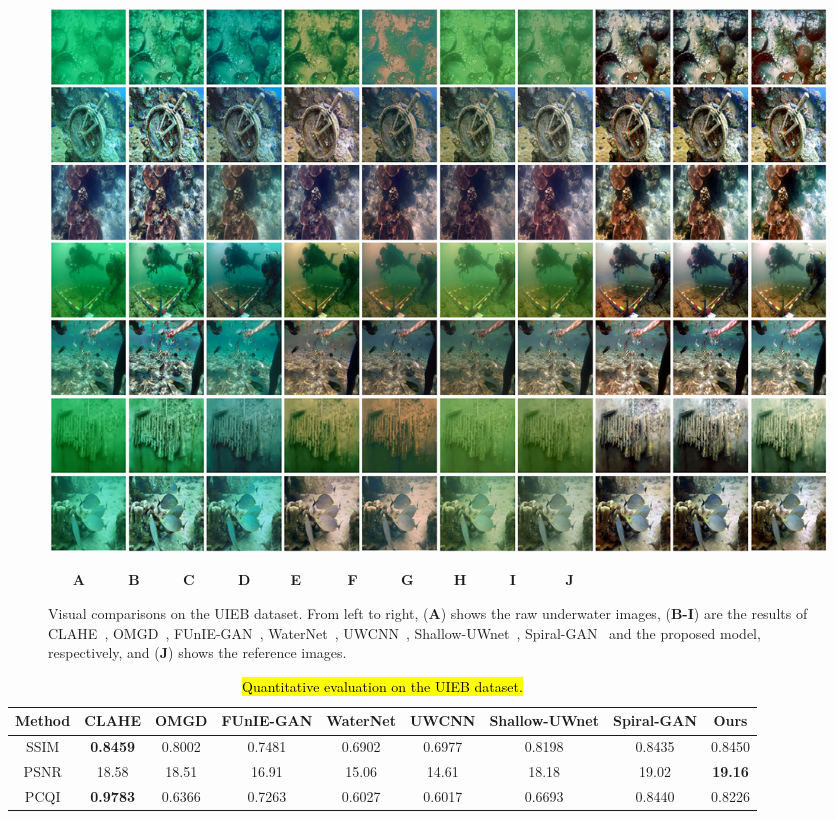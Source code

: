 \documentclass[utf8]{FrontiersinHarvard} %
\begin{document}
\begin{figure}[htbp]
\begin{center}
\includegraphics[width=1\textwidth]{FSpiralGAN_frontiers/onepicture/UIEB300.jpg}
\end{center}
$~~~~~~~~$\textbf{A}$~~~~~~~~~~~~~~$\textbf{B}$~~~~~~~~~~~~~~$\textbf{C}$~~~~~~~~~~~~~~$\textbf{D}$~~~~~~~~~~~~~$\textbf{E}$~~~~~~~~~~~~~~~$\textbf{F}$~~~~~~~~~~~~~~$\textbf{G}$~~~~~~~~~~~~~$\textbf{H}$~~~~~~~~~~~~~~$\textbf{I}$~~~~~~~~~~~~~~~~$\textbf{J}
 \caption{Visual comparisons on the UIEB dataset. From left to right, (\textbf{A}) shows the raw underwater images, (\textbf{B-I}) are the results of CLAHE~\citep{109340}, OMGD~\citep{ren2021online}, FUnIE-GAN~\citep{9001231}, WaterNet~\citep{8917818}, UWCNN~\citep{2019Underwater1}, Shallow-UWnet~\citep{naik2021shallow}, Spiral-GAN~\citep{2020Underwater} and the proposed model, respectively, and (\textbf{J}) shows the reference images.\label{fig:comparison-UIEBD}}
\end{figure}
\begin{table}[htbp]\normalsize
\centering
\setlength\tabcolsep{3pt}
\caption{\hl{Quantitative evaluation on the UIEB dataset.}}
\begin{tabular}{c|cccccccc}
\hline  
Method&CLAHE&OMGD&FUnIE-GAN&WaterNet&UWCNN&Shallow-UWnet&Spiral-GAN&Ours\\
\hline 
SSIM&\textbf{0.8459}&0.8002&0.7481&0.6902&0.6977&0.8198&0.8435&0.8450\\
\hline 
PSNR&18.58&18.51&16.91&15.06&14.61&18.18&19.02&\textbf{19.16}\\
\hline
PCQI&\textbf{0.9783}&0.6366&0.7263&0.6027&0.6017&0.6693&0.8440&0.8226\\
\hline
\end{tabular}
\label{tbl:comparison-UIEBD}
\end{table}
\end{document}
